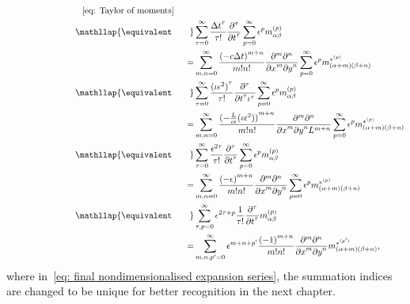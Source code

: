 \begin{align}
  \phantom{\equivalent\qquad}
  &\phantom{=}\text{\eqref{eq: Taylor of moments}}\\
  &\begin{aligned}
  \nonumber
    \mathllap{\equivalent\qquad} & \sum_{\tau = 0}^\infty \frac{{\Delta t}^\tau }{\tau!}  \frac{\partial^\tau}{{\partial t}^\tau} \sum_{p=0}^{\infty} \epsilon^p m_{\alpha\beta}^{(p)} \\
    = &{}\sum_{m,n = 0}^\infty \frac{{(-c\Delta t)}^{m+n}} {m!n!} \frac{\partial^m \partial^n}{ {\partial x}^m{\partial y}^n} \sum_{p=0}^{\infty} \epsilon^p m_{(\alpha + m)(\beta + n)}^{*^{(p)}}
  \end{aligned}\\
  &\begin{aligned}
    \label{eq: nondimensionalised expansion series}
    \mathllap{\equivalent\qquad} &
    \sum_{\tau = 0}^\infty \frac{{(\iota\epsilon^2)}^\tau }{\tau!} \frac{\partial^\tau}{{\partial t}^\tau \iota^\tau} \sum_{p=0}^{\infty} \epsilon^p m_{\alpha\beta}^{(p)} \\
    = &{}\sum_{m,n = 0}^\infty \frac{{(-\frac{L}{\iota\epsilon}(\iota\epsilon^2))}^{m+n}} {m!n!}
    \frac{\partial^m \partial^n}{ {\partial x}^m{\partial y}^n L^{m+n}} \sum_{p=0}^{\infty} \epsilon^p m_{(\alpha + m)(\beta + n)}^{*^{(p)}}
  \end{aligned} \\
  &\begin{aligned}
  \nonumber
    \mathllap{\equivalent\qquad} &
    \sum_{\tau = 0}^\infty \frac{\epsilon^{2\tau} }{\tau!} \frac{\partial^\tau}{{\partial t}^\tau} \sum_{p=0}^{\infty} \epsilon^p m_{\alpha\beta}^{(p)} \\
    = &{}\sum_{m,n = 0}^\infty \frac{{(-\epsilon)}^{m+n}} {m!n!}
    \frac{\partial^m \partial^n}{ {\partial x}^m{\partial y}^n } \sum_{p=0}^{\infty} \epsilon^p m_{(\alpha + m)(\beta + n)}^{*^{(p)}}
  \end{aligned} \\
  &\begin{aligned}
    \label{eq: final nondimensionalised expansion series}
    \mathllap{\equivalent\qquad} &
    \sum_{\tau, p = 0}^\infty\epsilon^{2\tau + p} \frac{1} {\tau!} \frac{\partial^\tau}{{\partial t}^\tau} m_{\alpha\beta}^{(p)} \\
    = &{} \sum_{m,n,p' = 0}^\infty  \epsilon^{m+n+p'} \frac{{(-1)}^{m+n}} {m!n!}
    \frac{\partial^m \partial^n}{ {\partial x}^m{\partial y}^n } m_{(\alpha + m)(\beta + n)}^{*^{(p')}},
  \end{aligned}
\end{align}
where in~\eqref{eq: final nondimensionalised expansion series}, the summation indices are changed to be unique for better recognition in the next chapter.

